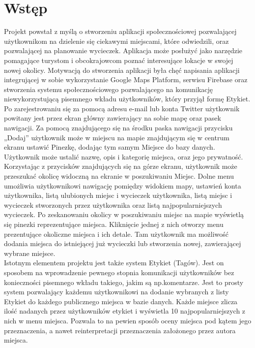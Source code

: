 \newpage
\section{Wstęp}

\vspace{1cm}
    Projekt powstał z myślą o stworzeniu aplikacji społecznościowej pozwalającej użytkownikom na dzielenie się ciekawymi miejscami, które odwiedzili, oraz 
    pozwalającej na planowanie wycieczek. Aplikacja może posłużyć jako narzędzie pomagające turystom i obcokrajowcom poznać interesujące lokacje w swojej nowej okolicy.
    Motywacją do stworzenia aplikacji była chęć napisania aplikacji integrującej w sobie wykorzystanie Google Maps Platform, serwisu Firebase oraz stworzenia systemu 
    społecznościowego pozwalającego na komunikację niewykorzystującą pisemnego wkładu użytkowników, który przyjął formę Etykiet. \\ 

    Po zarejestrowaniu się za pomocą adresu e-mail lub konta Twitter użytkownik powitany jest przez ekran główny zawierający na sobie mapę oraz pasek nawigacji.
    Za pomocą znajdującego się na środku paska nawigacji przycisku „Dodaj” użytkownik może w miejscu na mapie znajdującym się w centrum ekranu ustawić Pinezkę, 
    dodając tym samym Miejsce do bazy danych. Użytkownik może ustalić nazwę, opis i kategorię miejsca, oraz jego prywatność. Korzystając z przycisków znajdujących się
    na górze ekranu, użytkownik może przeszukać okolicę widoczną na ekranie w poszukiwaniu Miejsc. Dolne menu umożliwia użytkownikowi nawigację pomiędzy widokiem mapy,
    ustawień konta użytkownika, listą ulubionych miejsc i wycieczek użytkownika, listą miejsc i wycieczek stworzonych przez użytkownika oraz listą najpopularniejszych wycieczek.
    Po zeskanowaniu okolicy w poszukiwaniu miejsc na mapie wyświetlą się pinezki reprezentujące miejsca. Kliknięcie jednej z nich otworzy menu prezentujące okoliczne miejsca i ich detale.
    Tam użytkownik ma możliwość dodania miejsca do istniejącej już wycieczki lub stworzenia nowej, zawierającej wybrane miejsce. \\ 

    Istotnym elementem projektu jest także system Etykiet (Tagów). Jest on sposobem na wprowadzenie pewnego stopnia komunikacji użytkowników bez konieczności pisemnego wkładu
    takiego, jakim są np.\@ komentarze. Jest to prosty system pozwalający każdemu użytkownikowi na dodanie wybranych z listy Etykiet do każdego publicznego miejsca w bazie danych.
    Każde miejsce zlicza ilość nadanych przez użytkowników etykiet i wyświetla 10 najpopularniejszych z nich w menu miejsca. Pozwala to na pewien sposób oceny miejsca pod kątem jego przeznaczenia,
    a nawet reinterpretacji przeznaczenia założonego przez autora miejsca. \\

